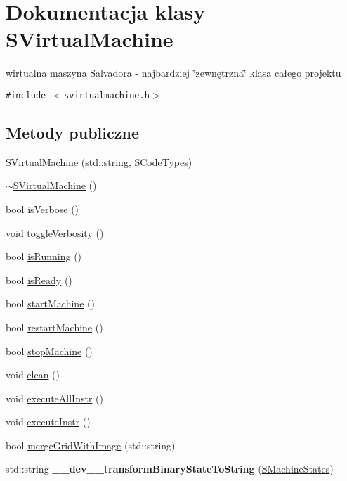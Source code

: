 \hypertarget{classSVirtualMachine}{
\section{Dokumentacja klasy SVirtualMachine}
\label{classSVirtualMachine}
}
wirtualna maszyna Salvadora - najbardziej \char`\"{}zewnętrzna\char`\"{} klasa całego projektu  


{\tt \#include $<$svirtualmachine.h$>$}

\subsection*{Metody publiczne}
\begin{CompactItemize}
\item 
\hyperlink{classSVirtualMachine_020a4e9202a688dffed1e0d8951f9164}{SVirtualMachine} (std::string, \hyperlink{senums_8h_1a2ae45552936d27425f99e1c187b043}{SCodeTypes})
\item 
\hyperlink{classSVirtualMachine_eb727bcfdf05d45526920aa512988249}{$\sim$SVirtualMachine} ()
\item 
bool \hyperlink{classSVirtualMachine_38d1e09d68d418ce34ae46d6a9dbb6dd}{isVerbose} ()
\item 
void \hyperlink{classSVirtualMachine_d099907121223d24b1a599a3518cf3b0}{toggleVerbosity} ()
\item 
bool \hyperlink{classSVirtualMachine_09f1f983396791f84947f80097351862}{isRunning} ()
\item 
bool \hyperlink{classSVirtualMachine_86dfbb99cbccd36729253cf34835c805}{isReady} ()
\item 
bool \hyperlink{classSVirtualMachine_49e93dd25b48a8dbba896f9b2964c526}{startMachine} ()
\item 
bool \hyperlink{classSVirtualMachine_5be1048d2d6f330994a10032d9609277}{restartMachine} ()
\item 
bool \hyperlink{classSVirtualMachine_81211b6ef712dbc4a147d7fa86aed440}{stopMachine} ()
\item 
void \hyperlink{classSVirtualMachine_85f2b4a688a077283010a11145289110}{clean} ()
\item 
void \hyperlink{classSVirtualMachine_f3874f10dac15f27b23dc4b976271413}{executeAllInstr} ()
\item 
void \hyperlink{classSVirtualMachine_200c4aae4eedf52ba7a3754295505186}{executeInstr} ()
\item 
bool \hyperlink{classSVirtualMachine_0257c841ecfbb17f2c85ffd2d8764de8}{mergeGridWithImage} (std::string)
\item 
\hypertarget{classSVirtualMachine_f8e1ef67bff80a4ce0aa7afc741a1a93}{
std::string \textbf{\_\-\_\-dev\_\-\_\-transformBinaryStateToString} (\hyperlink{senums_8h_c31b206c0c7cd52b9a0b18204f373c7e}{SMachineStates})}
\label{classSVirtualMachine_f8e1ef67bff80a4ce0aa7afc741a1a93}


\end{CompactItemize}

